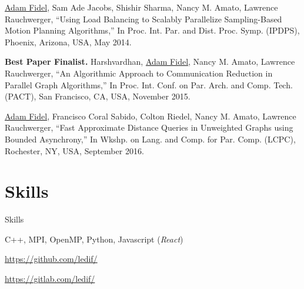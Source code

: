 \documentclass[a4paper,10pt,oneside]{article}
\begin{document}
\begin{body}
\EntryGap

\begin{detail}
{\underline{Adam Fidel}, Sam Ade Jacobs, Shishir Sharma, Nancy M. Amato, Lawrence Rauchwerger, ``Using Load Balancing to Scalably Parallelize Sampling-Based Motion Planning Algorithms,'' In Proc. Int. Par. and Dist. Proc. Symp. (IPDPS), Phoenix, Arizona, USA, May 2014.}
\end{detail}

\EntryGap

\begin{detail}
{{\bf Best Paper Finalist.} Harshvardhan, \underline{Adam Fidel}, Nancy M. Amato, Lawrence Rauchwerger, ``An Algorithmic Approach to Communication Reduction in Parallel Graph Algorithms,'' In Proc. Int. Conf. on Par. Arch. and Comp. Tech. (PACT), San Francisco, CA, USA, November 2015.}
\end{detail}

\EntryGap

\begin{detail}
{\underline{Adam Fidel}, Francisco Coral Sabido, Colton Riedel, Nancy M. Amato, Lawrence Rauchwerger, ``Fast Approximate Distance Queries in Unweighted Graphs using Bounded Asynchrony,'' In Wkshp. on Lang. and Comp. for Par. Comp. (LCPC), Rochester, NY, USA, September 2016.}
\end{detail}

\section{Skills}
{Skills}

C++, MPI, OpenMP, Python, Javascript (\emph{React})

\par
\EntryGap
\href{https://github.com/ledif/}{https://github.com/ledif/}
\par
\EntryGap
\href{https://gitlab.com/ledif/}{https://gitlab.com/ledif/}

\end{body}
\end{document}
